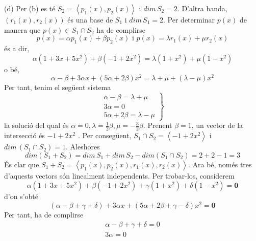 \begin{solucio}
(d) Per (b) es té $S_{2}=\left\langle
p_{1}(x),p_{2}(x)\right\rangle $ i $dim\,S_{2}=2$. D'altra banda, $%
(r_{1}(x),r_{2}(x))$ és una base de $S_{1}$ i $dim\,S%
_{1}=2 $. Per determinar $p(x)$ de manera que $p(x)\in S_{1}\cap
S_{2}$ ha de complirse%
\begin{equation*}
p(x)=\alpha p_{1}(x)+\beta p_{2}(x)\text{ \ \ \ i \ \ \ }p(x)=\lambda
r_{1}(x)+\mu r_{2}(x)
\end{equation*}%
és a dir,%
\begin{equation*}
\alpha (1+3x+5x^{2})+\beta (-1+2x^{2})=\lambda (1+x^{2})+\mu (1-x^{2})
\end{equation*}%
o bé,%
\begin{equation*}
\alpha -\beta +3\alpha x+(5\alpha +2\beta )x^{2}=\lambda +\mu +(\lambda -\mu
)x^{2}
\end{equation*}%
Per tant, tenim el següent sistema%
\begin{equation*}
\left.
\begin{array}{c}
\alpha -\beta =\lambda +\mu \\
3\alpha =0 \\
5\alpha +2\beta =\lambda -\mu%
\end{array}%
\right\}
\end{equation*}%
la solució del qual és $\alpha =0,\lambda =\frac{1}{2}\beta ,\mu =-\frac{3}{2}%
\beta $. Prenent $\beta =1$, un vector de la intersecció és $-1+2x^{2}$%
. Per consegüent, $S_{1}\cap S_{2}=\left\langle
-1+2x^{2}\right\rangle $ i $dim\,(S_{1}\cap S_{2})=1$.
Aleshores%
\begin{equation*}
dim(S_{1}+S_{2})=dim\,S_{1}+dim\,S%
_{2}-dim(S_{1}\cap S_{2})=2+2-1=3
\end{equation*}%
És clar que $S_{1}+S_{2}=\left\langle
p_{1}(x),p_{2}(x),r_{1}(x),r_{2}(x)\right\rangle $. Ara bé, només
tres d’aquests vectors són linealment independents. Per trobar-los,
considerem%
\begin{equation*}
\alpha (1+3x+5x^{2})+\beta (-1+2x^{2})+\gamma (1+x^{2})+\delta (1-x^{2})=%
\mathbf{0}
\end{equation*}%
d’on s’obté%
\begin{equation*}
(\alpha -\beta +\gamma +\delta )+3\alpha x+(5\alpha +2\beta +\gamma -\delta
)x^{2}=\mathbf{0}
\end{equation*}%
Per tant, ha de complirse%
\begin{equation*}
\left.
\begin{array}{r}
\alpha -\beta +\gamma +\delta =0 \\
3\alpha =0 \\

\end{array}
\end{equation*}
\end{solucio}
